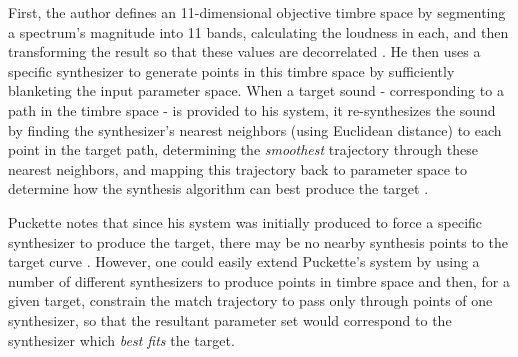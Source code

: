 \documentclass[12pt]{report} 	%
\numberwithin{figure}{chapter}
\numberwithin{table}{chapter}
\numberwithin{equation}{chapter}
\begin{document}
\begin{flushleft}
First, the author defines an 11-dimensional objective timbre space by segmenting a spectrum's magnitude into 11 bands, calculating the loudness in each, and then transforming the result so that these values are decorrelated \cite[p. 1-2]{Puckette:2004zp}. He then uses a specific synthesizer to generate points in this timbre space by sufficiently blanketing the input parameter space. When a target sound - corresponding to a path in the timbre space - is provided to his system, it re-synthesizes the sound by finding the synthesizer's nearest neighbors (using Euclidean distance) to each point in the target path, determining the \textit{smoothest} trajectory through these nearest neighbors, and mapping this trajectory back to parameter space to determine how the synthesis algorithm can best produce the target \cite[p. 3]{Puckette:2004zp}. 

Puckette notes that since his system was initially produced to force a specific synthesizer to produce the target, there may be no nearby synthesis points to the target curve \cite[p. 3]{Puckette:2004zp}. However, one could easily extend Puckette's system by using a number of different synthesizers to produce points in timbre space and then, for a given target, constrain the match trajectory to pass only through points of one synthesizer, so that the resultant parameter set would correspond to the synthesizer which \textit{best fits} the target. 


\end{flushleft}
\end{document}
